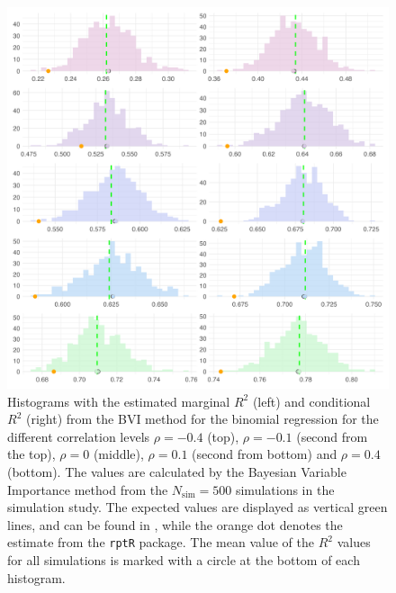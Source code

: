 \begin{figure}[H]
  \centering
  \includegraphics[width=1.1\linewidth]{Figures/Simulation study/R2_combined_logit.png}
  \caption[Marginal and conditional $R^2$ in Binomial GLMM]{Histograms with the estimated marginal $R^2$ (left) and conditional $R^2$ (right) from the BVI method for the binomial regression for the different correlation levels $\rho=-0.4$ (top), $\rho=-0.1$ (second from the top), $\rho=0$ (middle), $\rho=0.1$ (second from bottom) and $\rho=0.4$ (bottom). The values are calculated by the Bayesian Variable Importance method from the $N_{\text{sim}}=500$ simulations in the simulation study. The expected values are displayed as vertical green lines, and can be found in , while the orange dot denotes the estimate from the \texttt{rptR} package. The mean value of the $R^2$ values for all simulations is marked with a circle at the bottom of each histogram.}
  \label{fig:r2_combined_logit}
\end{figure}





